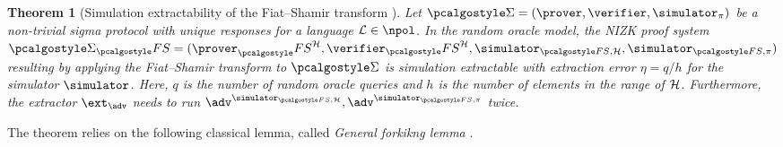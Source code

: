 \documentclass[runningheads,11pt]{llncs}
\newtheorem{theorem}{Theorem}%
\theoremstyle{definition}
\begin{document}
\begin{theorem}[Simulation extractability of the Fiat--Shamir transform \cite{INDOCRYPT:FKMV12}]
	Let $\sigmaprot = (\prover, \verifier, \simulator_\zkproof)$ be a non-trivial sigma protocol with unique responses for a language $\LANG \in \npol$.
	In the random oracle model, the NIZK proof system $\sigmaprot_\fs = (\prover_\fs^\ro, \verifier_\fs^\ro, \simulator_{\fs, \ro}, \simulator_{\fs, \zkproof})$ resulting by applying the Fiat--Shamir transform to $\sigmaprot$ is simulation extractable with extraction error $\eta = q/h$ for the simulator $\simulator$. Here, $q$ is the number of random oracle queries and $h$ is the number of elements in the range of $\mathcal{H}$.
	Furthermore, the extractor $\ext_\adv$ needs to run $\adv^{\simulator_{\fs, \ro}}, \adv^{\simulator_{\fs, \zkproof}}$ twice.
\end{theorem}

The theorem relies on the following classical lemma, called \emph{General forkikng lemma} \cite{JC:PoiSte00}.
%
\end{document}
